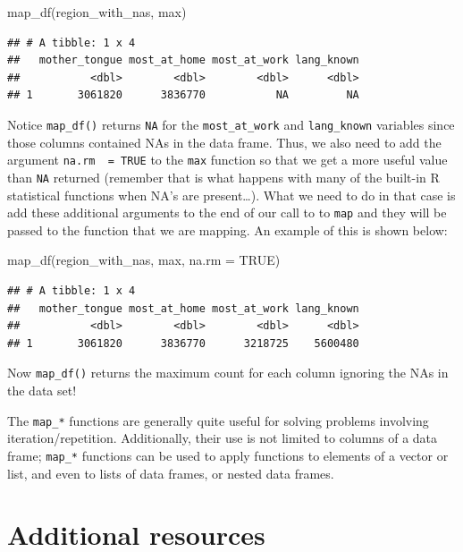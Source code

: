 \documentclass[
]{krantz}
\makeatletter
\newenvironment{Shaded}{\begin{snugshade}}{\end{snugshade}}
\newcommand{\AttributeTok}[1]{\textcolor[rgb]{0.61,0.61,0.61}{#1}}
\newcommand{\ConstantTok}[1]{\textcolor[rgb]{0,0,0}{#1}}
\newcommand{\FunctionTok}[1]{\textcolor[rgb]{0,0,0}{#1}}
\newcommand{\NormalTok}[1]{#1}
\newenvironment{kframe}{%
\medskip{}
\setlength{\fboxsep}{.8em}
 \def\at@end@of@kframe{}%
 \ifinner\ifhmode%
  \def\at@end@of@kframe{\end{minipage}}%
  \begin{minipage}{\columnwidth}%
 \fi\fi%
 \def\FrameCommand##1{\hskip\@totalleftmargin \hskip-\fboxsep
 \colorbox{shadecolor}{##1}\hskip-\fboxsep
     \hskip-\linewidth \hskip-\@totalleftmargin \hskip\columnwidth}%
 \MakeFramed {\advance\hsize-\width
   \@totalleftmargin\z@ \linewidth\hsize
   \@setminipage}}%
 {\par\unskip\endMakeFramed%
 \at@end@of@kframe}
\renewenvironment{Shaded}{\begin{kframe}}{\end{kframe}}
\makeatother
\begin{document}
\begin{Shaded}
\begin{Highlighting}[]
\FunctionTok{map\_df}\NormalTok{(region\_with\_nas, max)}
\end{Highlighting}
\end{Shaded}

\begin{verbatim}
## # A tibble: 1 x 4
##   mother_tongue most_at_home most_at_work lang_known
##           <dbl>        <dbl>        <dbl>      <dbl>
## 1       3061820      3836770           NA         NA
\end{verbatim}

Notice \texttt{map\_df()} returns \texttt{NA} for the \texttt{most\_at\_work} and \texttt{lang\_known} variables since those columns contained NAs in the data frame. Thus, we also need to add the argument \texttt{na.rm\ \ =\ TRUE} to the \texttt{max} function so that we get a more useful value than \texttt{NA} returned (remember that is what happens with many of the built-in R statistical functions when NA's are present\ldots). What we need to do in that case is add these additional arguments to the end of our call to to \texttt{map} and they will be passed to the function that we are mapping. An example of this is shown below:

\begin{Shaded}
\begin{Highlighting}[]
\FunctionTok{map\_df}\NormalTok{(region\_with\_nas, max, }\AttributeTok{na.rm =} \ConstantTok{TRUE}\NormalTok{)}
\end{Highlighting}
\end{Shaded}

\begin{verbatim}
## # A tibble: 1 x 4
##   mother_tongue most_at_home most_at_work lang_known
##           <dbl>        <dbl>        <dbl>      <dbl>
## 1       3061820      3836770      3218725    5600480
\end{verbatim}

Now \texttt{map\_df()} returns the maximum count for each column ignoring the NAs in the data set!

The \texttt{map\_*} functions are generally quite useful for solving problems involving iteration/repetition. Additionally, their use is not limited to columns
of a data frame; \texttt{map\_*} functions can be used to apply functions to elements of a vector or list, and even to lists of data frames, or nested data frames.

\hypertarget{additional-resources-1}{%
\section{Additional resources}\label{additional-resources-1}}
\end{document}
